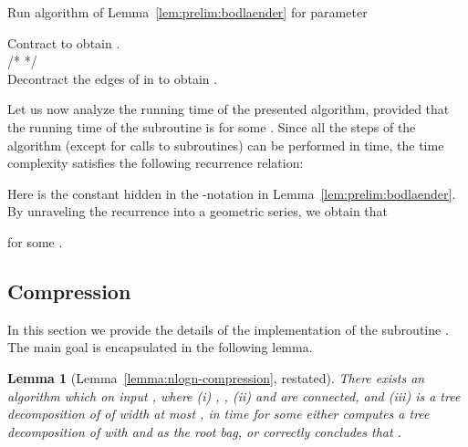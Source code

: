 \documentclass[a4paper,11pt]{article}
\newtheorem{lemma}{Lemma}[section]
\theoremstyle{definition}
\theoremstyle{remark}
\begin{document}
\begin{algorithm}[h!]

  
   \Indp \BlankLine
  \BlankLine Run algorithm of Lemma~\ref{lem:prelim:bodlaender} for
  parameter  \BlankLine {} \BlankLine
  
   {
    Contract  to obtain .\\
     \hspace{1cm}/*\textsf{\footnotesize{ 
    } }*/\\
    \eIf{}{ \KwRet{} } {
      Decontract the edges of  in  to obtain .\\
      \KwRet{ } } }
  
  \BlankLine {} \Indm
  \caption{}
  \label{alg:nlogn-alg-1}
\end{algorithm}

Let us now analyze the running time of the presented algorithm,
provided that the running time of the subroutine  is
 for some .  Since all the
steps of the algorithm (except for calls to subroutines) can be
performed in  time, the time complexity satisfies
the following recurrence relation:

Here  is the constant hidden in the -notation in
Lemma~\ref{lem:prelim:bodlaender}.  By unraveling the recurrence into
a geometric series, we obtain that

for some .


\subsection{Compression}\label{sec:nlogncompress}

In this section we provide the details of the implementation of the
subroutine .  The main goal is encapsulated in the
following lemma.

\begin{lemma}[Lemma~\ref{lemma:nlogn-compression}, restated]
  There exists an algorithm which on input , where
  (i) , , (ii)  and  are connected, and (iii)  is a tree decomposition of
   of width at most , in  time for some
   either computes a tree decomposition  of 
  with  and  as the root bag, or correctly
  concludes that .
\end{lemma}
\end{document}
